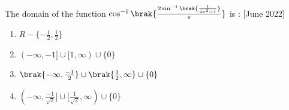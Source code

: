 \item The domain of the function $\cos^{-1}\brak{\frac{2\sin^{-1}\brak{\frac{1}{4x^2-1}}}{\pi}}$ is : \hfill[June 2022]
\begin{enumerate}
    \item $R-\{-\frac{1}{2},\frac{1}{2}\}$
    \item $(-\infty,-1]\cup [1,\infty)\cup \{0\}$
    \item $\brak{-\infty,\frac{-1}{2}}\cup\brak{\frac{1}{2},\infty}\cup \{0\}$
    \item $(-\infty,\frac{-1}{\sqrt{2}}]\cup [\frac{1}{\sqrt{2}},\infty)\cup \{0\}$
\end{enumerate}

